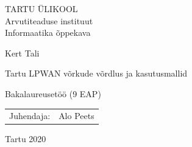 \documentclass[12pt]{article}
\newcommand{\TODO}{\todo[inline]}
\begin{document}
\thispagestyle{empty}
\begin{center}


\large
TARTU ÜLIKOOL\\
Arvutiteaduse instituut\\
Informaatika õppekava\\[2mm]


\vspace{25mm}

\Large Kert Tali

\vspace{4mm}

\huge Tartu LPWAN võrkude võrdlus ja kasutusmallid

\vspace{20mm}

\Large Bakalaureusetöö (9 EAP)

\end{center}

\vspace{2mm}

\begin{flushright}
 {
 \setlength{\extrarowheight}{5pt}
 \begin{tabular}{r l} 
  \sffamily Juhendaja: & \sffamily Alo Peets \\
 \end{tabular}
 }
\end{flushright}

\vspace{10mm}

\vfill
\centerline{Tartu 2020}




\newpage

\newcommand\EngInfo{{%
\selectlanguage{english}
\noindent\textbf{\large Comparison and use cases of LPWAN networks in Tartu}
\vspace*{1ex}

\noindent\textbf{Abstract:}
\TODO{Valmib lõpus}
\noindent

\vspace*{1ex}

\noindent\textbf{Keywords:}\\
IoT, LPWAN, LoRaWAN, Sigfox, NB-IoT, service comparison, use cases

\vspace*{1ex}

\noindent\textbf{CERCS:} T180 Telecommunication engineering; P170 Computer science, numerical analysis, systems, control

\vspace*{1ex}
}}%
\end{document}
